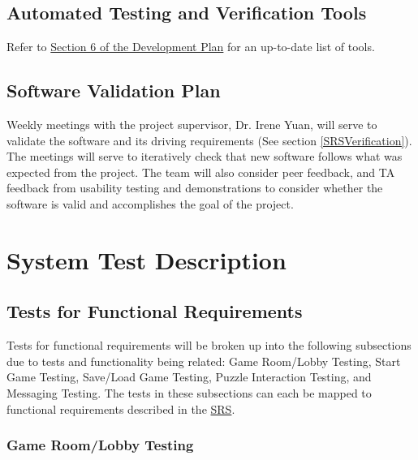 \documentclass[12pt, titlepage]{article}
\begin{document}
\subsection{Automated Testing and Verification Tools}

Refer to \href{https://github.com/SammyG7/Mac-AR/blob/main/docs/DevelopmentPlan/DevelopmentPlan.pdf}{Section 6 of the Development Plan} for an up-to-date list of tools.

\subsection{Software Validation Plan}

Weekly meetings with the project supervisor, Dr. Irene Yuan, will serve to validate the software and its driving requirements (See section \ref{SRSVerification}). The meetings will serve to iteratively check that new software follows what was expected from the project. The team will also consider peer feedback, and TA feedback from usability testing and demonstrations to consider whether the software is valid and accomplishes the goal of the project.

\section{System Test Description}
	
\subsection{Tests for Functional Requirements}


Tests for functional requirements will be broken up into the following subsections due to tests and functionality being related: Game Room/Lobby Testing, Start Game Testing, Save/Load Game Testing, Puzzle Interaction Testing, and Messaging Testing. The tests in these subsections can each be mapped to functional requirements described in the \href{https://github.com/SammyG7/Mac-AR/blob/main/docs/SRS/SRS.pdf}{SRS}.
\subsubsection{Game Room/Lobby Testing}
\end{document}
